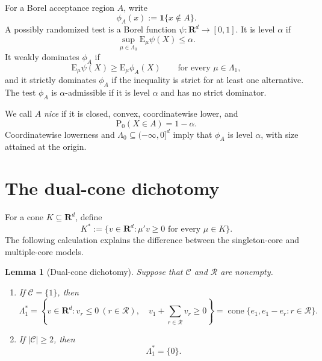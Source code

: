 \documentclass[12pt]{article}
\newtheorem{lemma}[theorem]{Lemma}
\theoremstyle{definition}
\theoremstyle{remark}
\newcommand{\E}{\mathrm E}
\newcommand{\Pp}{\mathrm P}
\newcommand{\R}{\mathbf R}
\newcommand{\cC}{\mathcal C}
\newcommand{\cR}{\mathcal R}
\newcommand{\1}{\mathbf 1}
\begin{document}
For a Borel acceptance region $A$, write
\[
\phi_A(x):=\1\{x\notin A\}.
\]
A possibly randomized test is a Borel function $\psi:\R^d\to[0,1]$.  It is
level $\alpha$ if
\[
\sup_{\mu\in\Lambda_0}\E_\mu\psi(X)\le\alpha.
\]
It weakly dominates $\phi_A$ if
\[
\E_\mu\psi(X)\ge\E_\mu\phi_A(X)
\qquad\text{for every }\mu\in\Lambda_1,
\]
and it strictly dominates $\phi_A$ if the inequality is strict for at least
one alternative.  The test $\phi_A$ is $\alpha$-admissible if it is level
$\alpha$ and has no strict dominator.

We call $A$ \emph{nice} if it is closed, convex, coordinatewise lower, and
\begin{equation}\label{eq:exact-size}
\Pp_0(X\in A)=1-\alpha.
\end{equation}
Coordinatewise lowerness and $\Lambda_0\subseteq(-\infty,0]^d$ imply that
$\phi_A$ is level $\alpha$, with size attained at the origin.

\section{The dual-cone dichotomy}

For a cone $K\subseteq\R^d$, define
\[
K^*:=\{v\in\R^d:\mu'v\ge0\text{ for every }\mu\in K\}.
\]
The following calculation explains the difference between the singleton-core
and multiple-core models.

\begin{lemma}[Dual-cone dichotomy]\label{lem:dual}
Suppose that $\cC$ and $\cR$ are nonempty.
\begin{enumerate}
\item If $\cC=\{1\}$, then
\begin{equation}\label{eq:dual-one-core}
\Lambda_1^*
=
\left\{v\in\R^d:
v_r\le0\ (r\in\cR),\quad
v_1+\sum_{r\in\cR}v_r\ge0
\right\}
=
\operatorname{cone}\{e_1,e_1-e_r:r\in\cR\}.
\end{equation}
\item If $|\cC|\ge2$, then
\begin{equation}\label{eq:dual-many-core}
\Lambda_1^*=\{0\}.
\end{equation}
\end{enumerate}
\end{lemma}
\end{document}
